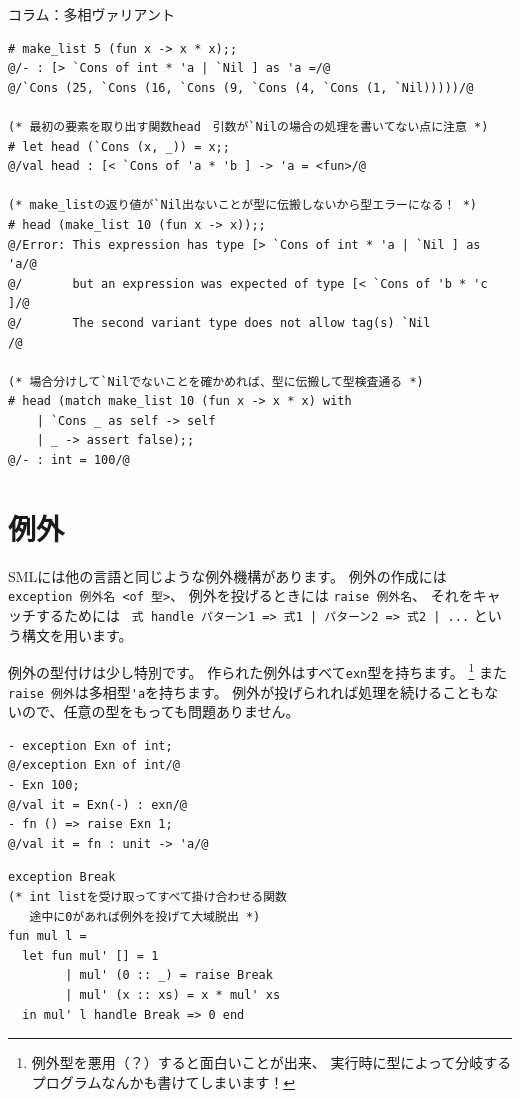 \documentclass[11pt,a4paper]{article}
\begin{document}
\begin{itembox}[l]{コラム：多相ヴァリアント}
\begin{lstlisting}[caption=多相ヴァリアントを用いたリスト構造(ocamlコード)]
# make_list 5 (fun x -> x * x);;
@/- : [> `Cons of int * 'a | `Nil ] as 'a =/@
@/`Cons (25, `Cons (16, `Cons (9, `Cons (4, `Cons (1, `Nil)))))/@

(* 最初の要素を取り出す関数head　引数が`Nilの場合の処理を書いてない点に注意 *)
# let head (`Cons (x, _)) = x;;
@/val head : [< `Cons of 'a * 'b ] -> 'a = <fun>/@

(* make_listの返り値が`Nil出ないことが型に伝搬しないから型エラーになる！ *)
# head (make_list 10 (fun x -> x));;
@/Error: This expression has type [> `Cons of int * 'a | `Nil ] as 'a/@
@/       but an expression was expected of type [< `Cons of 'b * 'c ]/@
@/       The second variant type does not allow tag(s) `Nil          /@

(* 場合分けして`Nilでないことを確かめれば、型に伝搬して型検査通る *)
# head (match make_list 10 (fun x -> x * x) with
    | `Cons _ as self -> self
    | _ -> assert false);;
@/- : int = 100/@
\end{lstlisting}

\end{itembox}

\section{例外}

SMLには他の言語と同じような例外機構があります。
例外の作成には \lstinline{exception 例外名 <of 型>}、
例外を投げるときには \lstinline{raise 例外名}、
それをキャッチするためには
\lstinline{ 式 handle パターン1 => 式1 | パターン2 => 式2 | ...}
という構文を用います。

例外の型付けは少し特別です。
作られた例外はすべて\lstinline{exn}型を持ちます。
\footnote{例外型を悪用（？）すると面白いことが出来、
実行時に型によって分岐するプログラムなんかも書けてしまいます\cite{use-exn}！}
また\lstinline{raise 例外}は多相型\lstinline{'a}を持ちます。
例外が投げられれば処理を続けることもないので、任意の型をもっても問題ありません。

\begin{minipage}[htb]{0.4\linewidth}
\begin{lstlisting}[caption=例外の型付け]
- exception Exn of int;
@/exception Exn of int/@
- Exn 100;
@/val it = Exn(-) : exn/@
- fn () => raise Exn 1;
@/val it = fn : unit -> 'a/@
\end{lstlisting}
\end{minipage}
\hfill
\begin{minipage}[htb]{0.6\linewidth}
\begin{lstlisting}[caption=例外を用いたプログラム例]
exception Break
(* int listを受け取ってすべて掛け合わせる関数　
   途中に0があれば例外を投げて大域脱出 *)
fun mul l =
  let fun mul' [] = 1
        | mul' (0 :: _) = raise Break
        | mul' (x :: xs) = x * mul' xs
  in mul' l handle Break => 0 end
\end{lstlisting}
\end{minipage}
\end{document}
